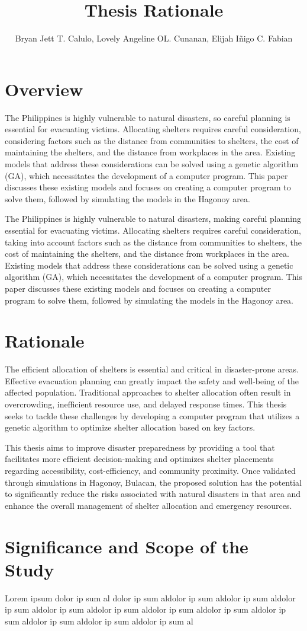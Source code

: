 \documentclass[english,12pt,a4paper]{article}
\title{Thesis Rationale}
\author{Bryan Jett T. Calulo, Lovely Angeline OL. Cunanan, Elijah Iñigo C. Fabian}
\begin{document}
	\maketitle
	
	\section*{Overview}
	The Philippines is highly vulnerable to natural disasters, so careful planning is essential for evacuating victims. Allocating shelters requires careful consideration, considering factors such as the distance from communities to shelters, the cost of maintaining the shelters, and the distance from workplaces in the area. Existing models that address these considerations can be solved using a genetic algorithm (GA), which necessitates the development of a computer program. This paper discusses these existing models and focuses on creating a computer program to solve them, followed by simulating the models in the Hagonoy area.
	
	The Philippines is highly vulnerable to natural disasters, making careful planning essential for evacuating victims. Allocating shelters requires careful consideration, taking into account factors such as the distance from communities to shelters, the cost of maintaining the shelters, and the distance from workplaces in the area. Existing models that address these considerations can be solved using a genetic algorithm (GA), which necessitates the development of a computer program. This paper discusses these existing models and focuses on creating a computer program to solve them, followed by simulating the models in the Hagonoy area.
	
	\section*{Rationale}
	The efficient allocation of shelters is essential and critical in disaster-prone areas. Effective evacuation planning can greatly impact the safety and well-being of the affected population. Traditional approaches to shelter allocation often result in overcrowding, inefficient resource use, and delayed response times. This thesis seeks to tackle these challenges by developing a computer program that utilizes a genetic algorithm to optimize shelter allocation based on key factors.
	
	
	This thesis aims to improve disaster preparedness by providing a tool that facilitates more efficient decision-making and optimizes shelter placements regarding accessibility, cost-efficiency, and community proximity. Once validated through simulations in Hagonoy, Bulacan, the proposed solution has the potential to significantly reduce the risks associated with natural disasters in that area and enhance the overall management of shelter allocation and emergency resources.
	
	\section*{Significance and Scope of the Study}
	Lorem ipsum dolor ip sum al dolor ip sum aldolor ip sum aldolor ip sum aldolor ip sum aldolor ip sum aldolor ip sum aldolor ip sum aldolor ip sum aldolor ip sum aldolor ip sum aldolor ip sum aldolor ip sum al
	
\end{document}
